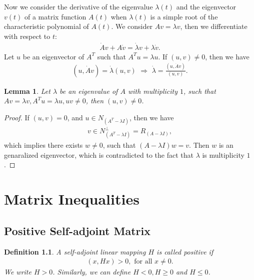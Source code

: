 \documentclass[11pt]{book}
\newtheorem{definition}{Definition}[section]
\newtheorem{lemma}[theorem]{Lemma}
\theoremstyle{definition}
\numberwithin{equation}{chapter}
\begin{document}
Now we consider the derivative of the eigenvalue $\lambda(t)$ and the eigenvector $v(t)$ of a matrix function $A(t)$ when $\lambda(t)$ is a simple root of the characteristic polynomial of $A(t)$. We consider $Av = \lambda v$, then we differentiate with respect to $t$:
\begin{align*}
    \dot{A}v + A\dot{v} = \dot{\lambda}v + \lambda \dot{v}.
\end{align*}
Let $u$ be an eigenvector of $A^T$ such that $A^T u = \lambda u$. If $(u,v)\neq 0$, then we have
\begin{align*}
    (u,\dot{A}v) = \dot{\lambda} (u,v)\,\, \Rightarrow \,\, \dot{\lambda} = \frac{(u,\dot{A}v)}{(u,v)}.
\end{align*}

\begin{lemma}
Let $\lambda$ be an eigenvalue of $A$ with multiplicity $1$, such that $Av = \lambda v, A^Tu = \lambda u, uv \neq 0$, then $(u,v)\neq 0$.
\end{lemma}
\begin{proof}
If $(u,v) = 0$, and $u\in N_{\left(A^T - \lambda I\right)}$, then we have 
\begin{align*}
    v \in N_{\left(A^T - \lambda I\right)}^\perp = R_{\left(A - \lambda I\right)},
\end{align*}
which implies there exists $w\neq 0$, such that $(A - \lambda I)w = v$. Then $w$ is an genaralized eigenvector, which is contradicted to the fact that $\lambda$ is multiplicity $1$.
\end{proof}

\medskip


\chapter{Matrix Inequalities}\label{matrix_inequalities}

\section{Positive Self-adjoint Matrix}

\begin{definition}
A self-adjoint linear mapping $H$ is called positive if 
\begin{align*}
    (x, Hx) > 0,\,\, \text{for all} \,\, x \neq 0.
\end{align*}
We write $H > 0$. Similarly, we can define $H < 0, H \geq 0$ and $H \leq 0$.
\end{definition}
\end{document}

